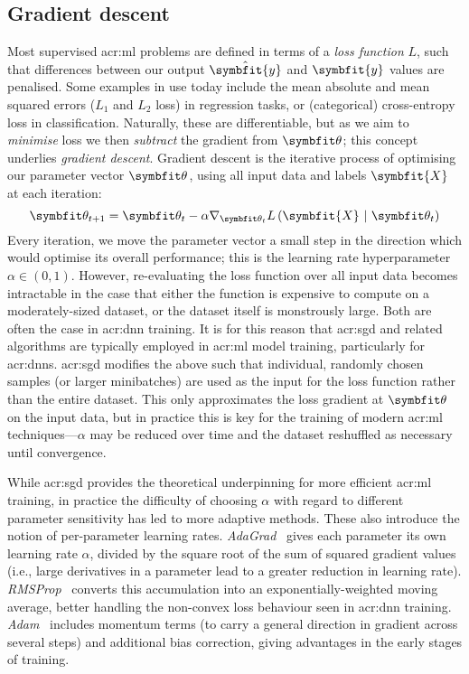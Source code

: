 \subsection{Gradient descent}
Most supervised \gls{acr:ml} problems are defined in terms of a \emph{loss function} $L$, such that differences between our output $\hat{\symbfit{y}}$ and $\symbfit{y}$ values are penalised.
Some examples in use today include the mean absolute and mean squared errors ($L_1$ and $L_2$ loss) in regression tasks, or (categorical) cross-entropy loss in classification.
Naturally, these are differentiable, but as we aim to \emph{minimise} loss we then \emph{subtract} the gradient from $\wvec{}$; this concept underlies \emph{gradient descent}.
Gradient descent is the iterative process of optimising our parameter vector $\wvec{}$, using all input data and labels $\symbfit{X}$ at each iteration:
\begin{equation}
	\wvec{t+1} = \wvec{t} - \alpha\nabla_{\wvec{t}}{L\left(\symbfit{X}~|~\wvec{t}\right)}
\end{equation}
Every iteration, we move the parameter vector a small step in the direction which would optimise its overall performance; this is the learning rate hyperparameter $\alpha\in\left(0,1\right)$.
However, re-evaluating the loss function over all input data becomes intractable in the case that either the function is expensive to compute on a moderately-sized dataset, or the dataset itself is monstrously large.
Both are often the case in \gls{acr:dnn} training.
It is for this reason that \gls{acr:sgd} and related algorithms are typically employed in \gls{acr:ml} model training, particularly for \glspl{acr:dnn}.
\gls{acr:sgd} modifies the above such that individual, randomly chosen samples (or larger minibatches) are used as the input for the loss function rather than the entire dataset.
This only approximates the loss gradient at $\wvec{}$ on the input data, but in practice this is key for the training of modern \gls{acr:ml} techniques---$\alpha$ may be reduced over time and the dataset reshuffled as necessary until convergence.

While \gls{acr:sgd} provides the theoretical underpinning for more efficient \gls{acr:ml} training, in practice the difficulty of choosing $\alpha$ with regard to different parameter sensitivity has led to more adaptive methods.
These also introduce the notion of per-parameter learning rates.
\emph{AdaGrad}~\parencite{DBLP:journals/jmlr/DuchiHS11} gives each parameter its own learning rate $\alpha$, divided by the square root of the sum of squared gradient values (i.e., large derivatives in a parameter lead to a greater reduction in learning rate).
\emph{RMSProp}~\parencite{rmsprop} converts this accumulation into an exponentially-weighted moving average, better handling the non-convex loss behaviour seen in \gls{acr:dnn} training.
\emph{Adam}~\parencite{DBLP:journals/corr/KingmaB14} includes momentum terms (to carry a general direction in gradient across several steps) and additional bias correction, giving advantages in the early stages of training.

